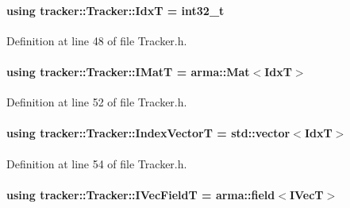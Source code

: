 \paragraph[{\texorpdfstring{IdxT}{IdxT}}]{\setlength{\rightskip}{0pt plus 5cm}using {\bf tracker\+::\+Tracker\+::\+IdxT} =  int32\+\_\+t}\hypertarget{classtracker_1_1Tracker_ad39a875dc6957cb6a9f3affcf6517d80}{}\label{classtracker_1_1Tracker_ad39a875dc6957cb6a9f3affcf6517d80}


Definition at line 48 of file Tracker.\+h.

\paragraph[{\texorpdfstring{I\+MatT}{IMatT}}]{\setlength{\rightskip}{0pt plus 5cm}using {\bf tracker\+::\+Tracker\+::\+I\+MatT} =  arma\+::\+Mat$<${\bf IdxT}$>$}\hypertarget{classtracker_1_1Tracker_a6de023cd3b5466996624c7e1b7e5d551}{}\label{classtracker_1_1Tracker_a6de023cd3b5466996624c7e1b7e5d551}


Definition at line 52 of file Tracker.\+h.

\paragraph[{\texorpdfstring{Index\+VectorT}{IndexVectorT}}]{\setlength{\rightskip}{0pt plus 5cm}using {\bf tracker\+::\+Tracker\+::\+Index\+VectorT} =  std\+::vector$<${\bf IdxT}$>$}\hypertarget{classtracker_1_1Tracker_a50ae514521f940c08813b45f53b6ce2d}{}\label{classtracker_1_1Tracker_a50ae514521f940c08813b45f53b6ce2d}


Definition at line 54 of file Tracker.\+h.

\paragraph[{\texorpdfstring{I\+Vec\+FieldT}{IVecFieldT}}]{\setlength{\rightskip}{0pt plus 5cm}using {\bf tracker\+::\+Tracker\+::\+I\+Vec\+FieldT} =  arma\+::field$<${\bf I\+VecT}$>$}\hypertarget{classtracker_1_1Tracker_a122e1d351fcb4444aec9729cf7625322}{}\label{classtracker_1_1Tracker_a122e1d351fcb4444aec9729cf7625322}


